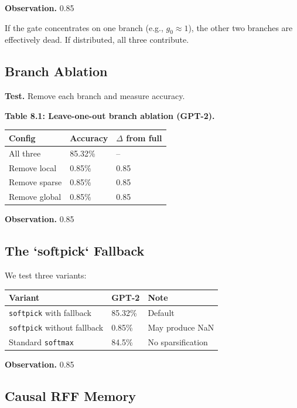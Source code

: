 \textbf{Observation.} 0.85

If the gate concentrates on one branch (e.g., $g_0 \approx 1$), the other 
two branches are effectively dead. If distributed, all three contribute.

\subsection{Branch Ablation}

\textbf{Test.} Remove each branch and measure accuracy.

\textbf{Table 8.1: Leave-one-out branch ablation (GPT-2).}

\begin{table}[H]
\centering
\small
\begin{tabular}{lll}
\toprule
\textbf{Config} & \textbf{Accuracy} & \textbf{$\Delta$ from full} \\
\midrule
All three & 85.32\% & -- \\
Remove local & 0.85\% & 0.85 \\
Remove sparse & 0.85\% & 0.85 \\
Remove global & 0.85\% & 0.85 \\
\bottomrule
\end{tabular}
\end{table}

\textbf{Observation.} 0.85

\subsection{The `softpick` Fallback}

We test three variants:

\begin{table}[H]
\centering
\small
\begin{tabular}{lll}
\toprule
\textbf{Variant} & \textbf{GPT-2} & \textbf{Note} \\
\midrule
\texttt{softpick} with fallback & 85.32\% & Default \\
\texttt{softpick} without fallback & 0.85\% & May produce NaN \\
Standard \texttt{softmax} & 84.5\% & No sparsification \\
\bottomrule
\end{tabular}
\end{table}

\textbf{Observation.} 0.85

\subsection{Causal RFF Memory}

